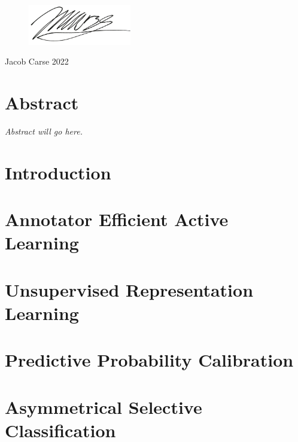\documentclass[12pt]{report}
\begin{document}
	\vspace{30pt}
	\begin{flushright}
		\begin{figure}[h]
			\begin{flushright}
				\includegraphics[width=0.4\textwidth]{images/signature.png}
			\end{flushright}
		\end{figure}
	
		Jacob Carse
		2022
	
	\end{flushright}

	\newpage
	\chapter*{Abstract}
	\textit{Abstract will go here.}

	
	\newpage
	\chapter{Introduction}
	\label{ch:introduction}
	
	
	
	\chapter{Annotator Efficient Active Learning}
	\label{ch:active_learning}
	
	
	
	\chapter{Unsupervised Representation Learning}
	\label{ch:unsupervised_representation_learning}
	
	
	
	\chapter{Predictive Probability Calibration}
	\label{ch:classification_claibration}
	
	
	
	\chapter{Asymmetrical Selective Classification}
	\label{ch:selective_classification}
	
	
\end{document}
